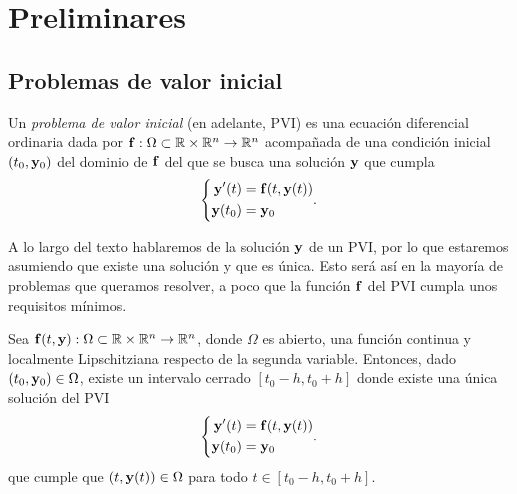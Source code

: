 \section{Preliminares}

\subsection{Problemas de valor inicial}

\begin{definition}\label{eqn:pvi}
    Un \emph{problema de valor inicial} (en adelante, PVI)
    es una ecuación diferencial ordinaria dada por
    $\vb{f}{} : \Omega \subset \mathbb{R} \times \mathbb{R}^n \to \mathbb{R}^n$
    acompañada de una condición inicial $(t_0, \vb{y}{}_0)$ del dominio de $\vb{f}{}$
    del que se busca una solución $\vb{y}{}$ que cumpla
    \begin{equation*}
        \left\{
        \begin{aligned}
            \vb{y}{}'(t) &= \vb{f}{}(t, \vb{y}{}(t)) \\
            \vb{y}{}(t_0) &= \vb{y}{}_0 \\
        \end{aligned}.
        \right.
    \end{equation*}
\end{definition}


A lo largo del texto hablaremos de la solución $\vb{y}{}$ de un PVI,
por lo que estaremos asumiendo que existe una solución y que es única.
Esto será así en la mayoría de problemas que queramos resolver,
a poco que la función $\vb{f}{}$ del PVI cumpla unos requisitos mínimos.

\begin{theorem}
    Sea $\vb{f}{}(t, \vb{y}{}) : \Omega \subset \mathbb{R} \times \mathbb{R}^n \to \mathbb{R}^n$,
    donde $\Omega$ es abierto,
    una función continua y
    localmente Lipschitziana respecto de la segunda variable.
    Entonces, dado $(t_0, \vb{y}{}_0) \in \Omega$,
    existe un intervalo cerrado $[t_0 - h, t_0 + h]$
    donde existe una única solución del PVI
    \begin{equation*}
        \left\{
        \begin{aligned}
            \vb{y}{}'(t) &= \vb{f}{}(t, \vb{y}{}(t)) \\
            \vb{y}{}(t_0) &= \vb{y}{}_0 \\
        \end{aligned}.
        \right.
    \end{equation*}
    que cumple que $(t, \vb{y}{}(t)) \in \Omega$ para todo $t \in [t_0 - h, t_0 + h]$.
\end{theorem}

